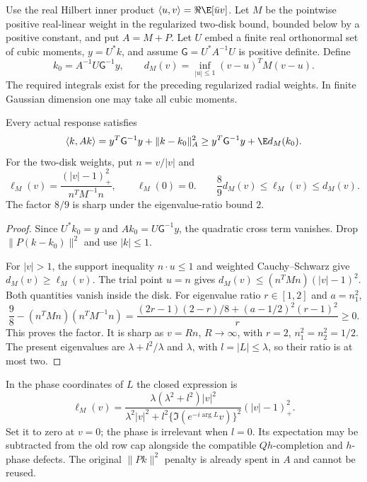 Use the real Hilbert inner product $\langle u,v\rangle=\Re\E[\bar u v]$.
Let $M$ be the pointwise positive real-linear weight in the regularized
two-disk bound, bounded below by a positive constant, and put $A=M+P$.
Let $U$ embed a finite real orthonormal set of cubic moments,
$y=U^*k$, and assume $\mathsf G=U^*A^{-1}U$ is positive definite. Define
\[
 k_0=A^{-1}U\mathsf G^{-1}y,\qquad
 d_M(v)=\inf_{|u|\le1}(v-u)^TM(v-u).
\]
The required integrals exist for the preceding regularized radial weights.
In finite Gaussian dimension one may take all cubic moments.

\begin{theorem}
\label{thm:bounded-interpolant-correction}
Every actual response satisfies
\begin{equation}\label{eq:clipped-gram-correction}
 \langle k,Ak\rangle
 =y^T\mathsf G^{-1}y+\|k-k_0\|_A^2
 \ge y^T\mathsf G^{-1}y+\E d_M(k_0).
\end{equation}
For the two-disk weights, put $n=v/|v|$ and
\[
 \ell_M(v)=\frac{(|v|-1)_+^2}{n^TM^{-1}n},\qquad\ell_M(0)=0.
 \qquad \frac89d_M(v)\le\ell_M(v)\le d_M(v).
\]
The factor $8/9$ is sharp under the eigenvalue-ratio bound $2$.
\end{theorem}
\begin{proof}
Since $U^*k_0=y$ and $Ak_0=U\mathsf G^{-1}y$, the quadratic cross
term vanishes. Drop $\|P(k-k_0)\|^2$ and use $|k|\le1$.

For $|v|>1$, the support inequality $n\cdot u\le1$ and weighted
Cauchy--Schwarz give $d_M(v)\ge\ell_M(v)$. The trial point $u=n$
gives $d_M(v)\le(n^TMn)(|v|-1)^2$. Both quantities vanish inside
the disk. For eigenvalue ratio $r\in[1,2]$ and $a=n_1^2$,
\[
 \frac98-(n^TMn)(n^TM^{-1}n)
 =\frac{(2r-1)(2-r)/8+(a-1/2)^2(r-1)^2}{r}\ge0.
\]
This proves the factor. It is sharp as $v=Rn$, $R\to\infty$,
with $r=2$, $n_1^2=n_2^2=1/2$. The present eigenvalues are
$\lambda+l^2/\lambda$ and $\lambda$, with $l=|L|\le\lambda$,
so their ratio is at most two.
\end{proof}
In the phase coordinates of $L$ the closed expression is
\[
 \ell_M(v)=
 \frac{\lambda(\lambda^2+l^2)|v|^2}
 {\lambda^2|v|^2+l^2\{\Im(e^{-i\arg L}v)\}^2}
 (|v|-1)_+^2.
\]
Set it to zero at $v=0$; the phase is irrelevant when $l=0$.
Its expectation may be subtracted from the old row cap alongside the
compatible $Qh$-completion and $h$-phase defects. The original
$\|Pk\|^2$ penalty is already spent in $A$ and cannot be reused.

